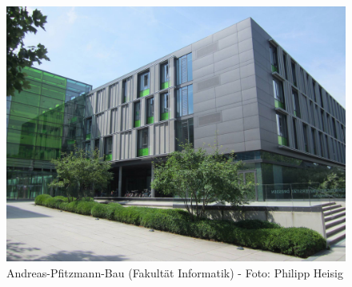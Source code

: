 \begin{figure}
\centering \includegraphics[width=\linewidth]{img/fakultaet.jpg}
\caption*{{\small Andreas-Pfitzmann-Bau (Fakultät Informatik) - Foto: Philipp Heisig}}
\end{figure}
